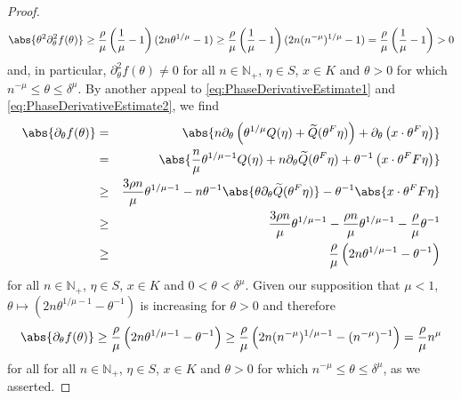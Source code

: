 \documentclass[11pt, letter]{book}
\begin{document}
\begin{proof}
\begin{equation*}
    \abs{\theta^2\partial_\theta^2 f(\theta)}\geq \frac{\rho}{\mu}\left(\frac{1}{\mu}-1\right)(2n\theta^{1/\mu}-1)\geq \frac{\rho}{\mu}\left(\frac{1}{\mu}-1\right)(2n (n^{-\mu})^{1/\mu}-1)=\frac{\rho}{\mu}\left(\frac{1}{\mu}-1\right)>0
\end{equation*}
and, in particular, $\partial_\theta^2 f(\theta)\neq 0$ for all $n\in\mathbb{N}_+$, $\eta\in S$, $x\in K$ and $\theta>0$ for which $n^{-\mu}\leq\theta\leq\delta^{\mu}$. By another appeal to \eqref{eq:PhaseDerivativeEstimate1} and \eqref{eq:PhaseDerivativeEstimate2}, we find
\begin{eqnarray*}
    \abs{\partial_\theta f(\theta)} &=& \abs{n\partial_\theta \left(\theta^{1/\mu}Q(\eta)+\widetilde{Q}(\theta^F\eta)\right)+\partial_\theta\left(x\cdot \theta^F \eta\right)}\\
    &=&\abs{\frac{n}{\mu}\theta^{1/\mu-1}Q(\eta)+n\partial_\theta\widetilde{Q}(\theta^F\eta)+\theta^{-1}\left(x\cdot\theta^F F\eta\right)}\\
    &\geq &\frac{3\rho n}{\mu}\theta^{1/\mu-1}-n\theta^{-1}\abs{\theta\partial_\theta \widetilde{Q}(\theta^F\eta)}-\theta^{-1}\abs{x\cdot\theta^F F\eta}\\
    &\geq& \frac{3\rho n}{\mu}\theta^{1/\mu-1}-\frac{\rho n}{\mu}\theta^{1/\mu-1}-\frac{\rho}{\mu}\theta^{-1}\\
    &\geq &\frac{\rho}{\mu}\left(2n\theta^{1/\mu-1}-\theta^{-1}\right)
\end{eqnarray*}
for all $n\in\mathbb{N}_+$, $\eta\in S$, $x\in K$ and $0<\theta<\delta^{\mu}$. Given our supposition that $\mu<1$, $\theta\mapsto\left( 2n\theta^{1/\mu-1}-\theta^{-1}\right)$ is increasing for $\theta>0$ and therefore
\begin{equation*}
 \abs{\partial_\theta f(\theta)}\geq\frac{\rho}{\mu}\left(2n\theta^{1/\mu-1}-\theta^{-1}\right)\geq \frac{\rho}{\mu}\left(2n(n^{-\mu})^{1/\mu-1}-(n^{-\mu})^{-1}\right)=\frac{\rho}{\mu}n^{\mu}
\end{equation*}
for all for all $n\in\mathbb{N}_+$, $\eta\in S$, $x\in K$ and $\theta>0$ for which $n^{-\mu}\leq\theta\leq\delta^{\mu}$, as we asserted.
\end{proof}
\end{document}
